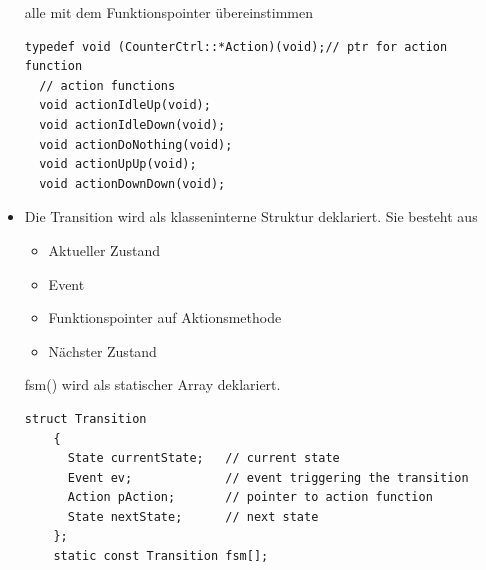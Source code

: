 \begin{itemize}
  alle mit dem Funktionspointer übereinstimmen
 \begin{lstlisting}[style=Cpp]
 typedef void (CounterCtrl::*Action)(void);// ptr for action function
  // action functions 
  void actionIdleUp(void); 
  void actionIdleDown(void); 
  void actionDoNothing(void); 
  void actionUpUp(void); 
  void actionDownDown(void);
 \end{lstlisting}
 \item Die Transition wird als klasseninterne Struktur deklariert. Sie besteht
 aus
 \begin{itemize}
   \item Aktueller Zustand
   \item Event
   \item Funktionspointer auf Aktionsmethode
   \item Nächster Zustand
 \end{itemize}
fsm() wird als statischer Array deklariert.
\begin{lstlisting}[style=Cpp]
struct Transition
    {
      State currentState;   // current state
      Event ev;             // event triggering the transition
      Action pAction;       // pointer to action function
      State nextState;      // next state
    };
    static const Transition fsm[];
\end{lstlisting}


\end{itemize}
